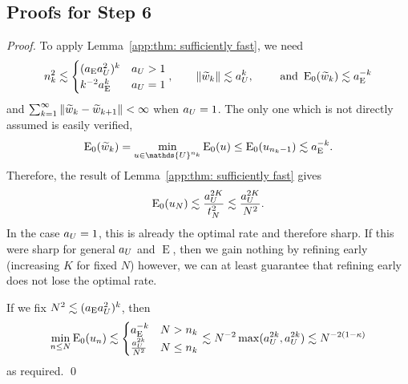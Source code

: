 \documentclass[smallextended]{svjour3}
\let\F\mathds\let\C\mathcal\newcommand{\R}{\F{R}}\newcommand{\A}{\tens{A}}
\newcommand{\norm}[1]{{\left\lVert #1 \right\rVert}}
\newcommand{\op}[1]{\operatorname{#1}}
\newcommand{\splitln}[4]{\begin{cases} #1 & #2 \\ #3 & #4\end{cases}}
\newcommand{\1}{\F{1}}
\newcommand*{\varf}[1]{%
	\IfEqCase{#1}{%
		{0}{u}%
		{1}{v}%
		{2}{w}%
	}[u#1]%
}
\newcommand*{\Varf}[1]{%
	\IfEqCase{#1}{%
		{0}{U}%
		{1}{V}%
		{2}{W}%
	}[u#1]%
}
\newcommand*{\spcf}[1]{%
	\IfEqCase{#1}{%
		{0}{\F{U}}%
		{1}{\F{V}}%
		{2}{\F{W}}%
	}[\F{U}#1]%
}
\newcommand*{\vars}[1]{%
	\IfEqCase{#1}{%
		{0}{\alpha}%
		{1}{\beta}%
		{2}{\gamma}%
		{3}{a}%
		{4}{b}%
		{5}{c}%
	}[k#1]%
}
\begin{document}
	\subsection{Proofs for Step 6}
	\begin{theorem}\label{app:thm: stronger exponential FISTA convergence}
	\end{theorem}
	\begin{proof}
		To apply Lemma~\ref{app:thm: sufficiently fast}, we need
		\begin{equation}
			n_k^2\lesssim \splitln{(\vars3_{\op{E}}\vars3_{\Varf0}^2)^k}{\vars3_{\Varf0}>1}{k^{-2}\vars3_{\op{E}}^k}{\vars3_{\Varf0}=1}, \qquad \norm{\tilde{\varf2}_k}\lesssim \vars3_{\Varf0}^{k}, \qquad \text{ and } \op{E}_0(\tilde{\varf2}_k)\lesssim \vars3_{\op{E}}^{-k}
		\end{equation}
		and $\sum_{k=1}^\infty\norm{\tilde{\varf2}_k-\tilde{\varf2}_{k+1}}<\infty$ when $\vars3_{\Varf0}=1$. The only one which is not directly assumed is easily verified,
		\begin{equation}
			\op{E}_0(\tilde{\varf2}_k) = \min_{\varf0\in\spcf0^{n_k}}\op{E}_0(\varf0) \leq\op{E}_0(\varf0_{n_k-1}) \lesssim \vars3_{\op{E}}^{-k}.
		\end{equation}
		Therefore, the result of Lemma~\ref{app:thm: sufficiently fast} gives
		\begin{equation}
			\op{E}_0(\varf0_N) \lesssim \frac{\vars3_{\Varf0}^{2K}}{t_N^2} \lesssim \frac{\vars3_{\Varf0}^{2K}}{N^2}.
		\end{equation}
		In the case $\vars3_{\Varf0}=1$, this is already the optimal rate and therefore sharp. If this were sharp for general $\vars3_{\Varf0}$ and $\op{E}$, then we gain nothing by refining early (increasing $K$ for fixed $N$) however, we can at least guarantee that refining early does not lose the optimal rate.
		
		If we fix $N^2\lesssim (\vars3_{\op{E}}\vars3_{\Varf0}^2)^k$, then
		\begin{equation}
			\min_{n\leq N} \op{E}_0(\varf0_n)\lesssim \splitln{\vars3_{\op{E}}^{-k}}{N>n_k}{ \frac{\vars3_{\Varf0}^{2k}}{N^2}}{N\leq n_k} \lesssim N^{-2}\max(\vars3_{\Varf0}^{2k},\vars3_{\Varf0}^{2k}) \lesssim N^{-2(1-\kappa)}
		\end{equation}
		as required.
		\qed\end{proof}
	
	
	
\end{document}
